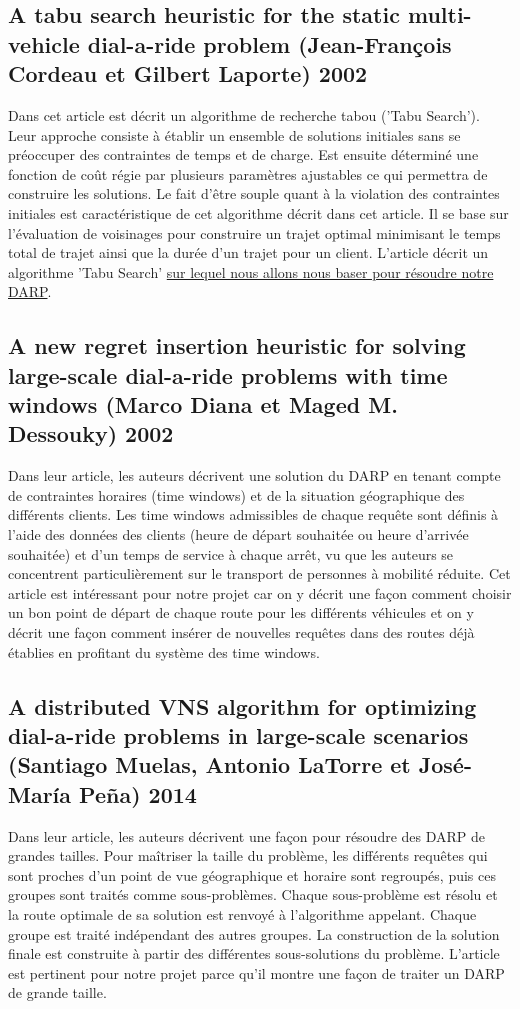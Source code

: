 \documentclass[10pt,a4paper]{report}
\begin{document}
\subsection*{A tabu search heuristic for the static multi-vehicle dial-a-ride problem (Jean-François Cordeau et Gilbert Laporte) 2002}
Dans cet article est décrit un algorithme de recherche tabou ('Tabu Search'). Leur approche consiste à établir un ensemble de solutions initiales sans se préoccuper des contraintes de temps et de charge. Est ensuite déterminé une fonction de coût régie par plusieurs paramètres ajustables ce qui permettra de construire les solutions. Le fait d'être souple quant à la violation des contraintes initiales est caractéristique de cet algorithme décrit dans cet article. Il se base sur l'évaluation de voisinages pour construire un trajet optimal minimisant le temps total de trajet ainsi que la durée d'un trajet pour un client. L'article décrit un algorithme 'Tabu Search' \underline{sur lequel nous allons nous baser pour résoudre notre DARP}.
\subsection*{A new regret insertion heuristic for solving large-scale dial-a-ride problems with time windows (Marco Diana et Maged M. Dessouky) 2002} 
 Dans leur article, les auteurs décrivent une solution du DARP en tenant compte de contraintes horaires (time windows) et de la situation géographique des différents clients. Les time windows admissibles de chaque requête sont définis à l'aide des données des clients (heure de départ souhaitée ou heure d'arrivée souhaitée) et d'un temps de service à chaque arrêt, vu que les auteurs se concentrent particulièrement sur le transport de personnes à mobilité réduite. Cet article est intéressant pour notre projet car on y décrit une façon comment choisir un bon point de départ de chaque route pour les différents véhicules et on y décrit une façon comment insérer de nouvelles requêtes dans des routes déjà établies en profitant du système des time windows.
\subsection*{A distributed VNS algorithm for optimizing dial-a-ride problems in large-scale scenarios (Santiago Muelas, Antonio LaTorre et José-María Peña) 2014}
Dans leur article, les auteurs décrivent une façon pour résoudre des DARP de grandes tailles. Pour maîtriser la taille du problème, les différents requêtes qui sont proches d'un point de vue géographique et horaire sont regroupés, puis ces groupes sont traités comme sous-problèmes. Chaque sous-problème est résolu et la route optimale de sa solution est renvoyé à l'algorithme appelant. Chaque groupe est traité indépendant des autres groupes. La construction de la solution finale est construite à partir des différentes sous-solutions du problème. L'article est pertinent pour notre projet parce qu'il montre une façon de traiter un DARP de grande taille.
\end{document}
